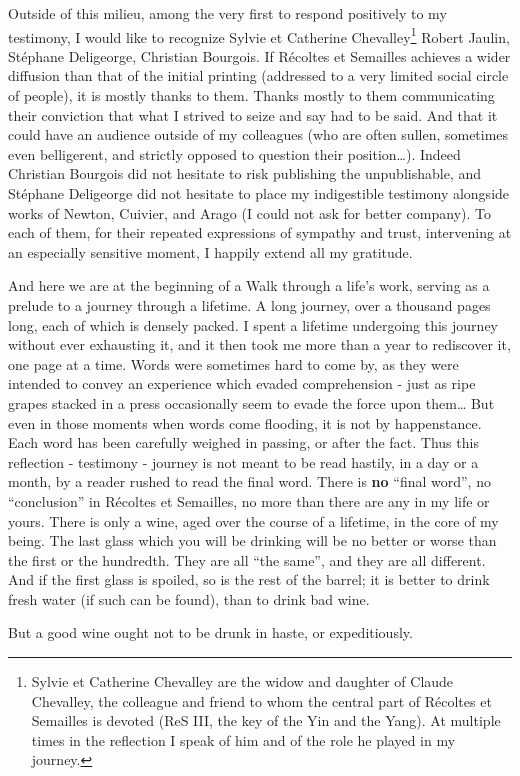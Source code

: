Outside of this milieu, among the very first to respond positively to my testimony,
I would like to recognize 
Sylvie et Catherine Chevalley\footnote{Sylvie et Catherine Chevalley are the widow and
daughter of Claude Chevalley, the colleague and friend to whom the central part of 
R\'ecoltes et Semailles is devoted (ReS III, the key of the Yin and the Yang).
At multiple times in the reflection I speak of him and of the role he played in my
journey.} Robert Jaulin, St\'ephane Deligeorge, Christian Bourgois. 
If R\'ecoltes et Semailles achieves a wider diffusion than that of the initial 
printing (addressed to a very limited social circle of people), it is mostly thanks to
them. Thanks mostly to them communicating their 
conviction that what I strived to seize and say had to be said. 
And that it could have an audience outside of my colleagues (who are often sullen,
sometimes even belligerent, and strictly opposed to question their position\ldots).
Indeed Christian Bourgois did not hesitate to risk publishing the unpublishable, and
St\'ephane Deligeorge did not hesitate to place my 
indigestible testimony alongside works of Newton, Cuivier, and Arago (I could not ask for
better company).
To each of them, for their repeated expressions of sympathy and trust, intervening at an
especially sensitive moment, I happily extend all my gratitude. 

And here we are at the beginning of a Walk through a life's work, serving as a prelude to
a journey through a lifetime. 
A long journey, over a thousand pages long, each of which is
densely packed. I spent a lifetime undergoing this journey without ever 
exhausting it, and it then took me more than a year to rediscover it, 
one page at a time.
Words were sometimes hard to come by, as they were 
intended to convey an experience which evaded comprehension - just as ripe grapes stacked
in a press occasionally seem to evade the force upon them\ldots
But even in those moments when words come flooding, it is not by happenstance. 
Each word has been carefully 
weighed in passing, or after the fact.
Thus this reflection - testimony - journey is not meant to be read hastily, in a day or a
month, by a reader rushed to read the final word. There is \textbf{no} 
``final word'', no
``conclusion'' in 
R\'ecoltes et Semailles, no more than there are any in my life or yours. 
There is only a wine, aged over the course of a lifetime, in the core of my being.
The last glass which you will be drinking will be no better or worse than the first or the
hundredth. 
They are all ``the same'', and they are all different. And if the first glass is spoiled,
so is the rest of the barrel; it is better to drink fresh water (if such can be found),
than to drink bad wine. 

But a good wine ought not to be drunk in haste, or 
expeditiously. 

